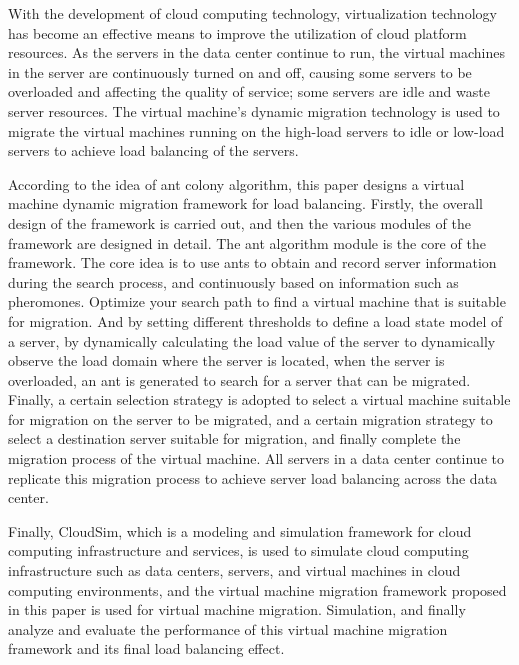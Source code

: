 \begin{enabstract}
With the development of cloud computing technology, virtualization technology has become an effective means to improve the utilization of cloud platform resources. As the servers in the data center continue to run, the virtual machines in the server are continuously turned on and off, causing some servers to be overloaded and affecting the quality of service; some servers are idle and waste server resources. The virtual machine's dynamic migration technology is used to migrate the virtual machines running on the high-load servers to idle or low-load servers to achieve load balancing of the servers.

According to the idea of ant colony algorithm, this paper designs a virtual machine dynamic migration framework for load balancing. Firstly, the overall design of the framework is carried out, and then the various modules of the framework are designed in detail. The ant algorithm module is the core of the framework. The core idea is to use ants to obtain and record server information during the search process, and continuously based on information such as pheromones. Optimize your search path to find a virtual machine that is suitable for migration. And by setting different thresholds to define a load state model of a server, by dynamically calculating the load value of the server to dynamically observe the load domain where the server is located, when the server is overloaded, an ant is generated to search for a server that can be migrated. Finally, a certain selection strategy is adopted to select a virtual machine suitable for migration on the server to be migrated, and a certain migration strategy to select a destination server suitable for migration, and finally complete the migration process of the virtual machine. All servers in a data center continue to replicate this migration process to achieve server load balancing across the data center.

Finally, CloudSim, which is a modeling and simulation framework for cloud computing infrastructure and services, is used to simulate cloud computing infrastructure such as data centers, servers, and virtual machines in cloud computing environments, and the virtual machine migration framework proposed in this paper is used for virtual machine migration. Simulation, and finally analyze and evaluate the performance of this virtual machine migration framework and its final load balancing effect.

\end{enabstract}
